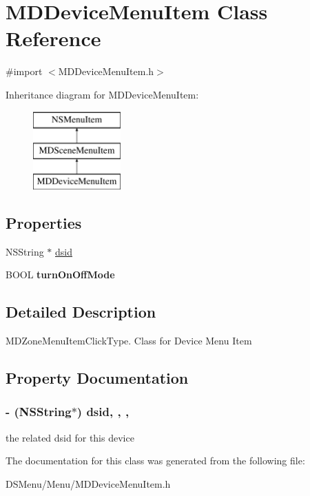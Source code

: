 \hypertarget{interface_m_d_device_menu_item}{\section{M\-D\-Device\-Menu\-Item Class Reference}
\label{interface_m_d_device_menu_item}
}


{\ttfamily \#import $<$M\-D\-Device\-Menu\-Item.\-h$>$}

Inheritance diagram for M\-D\-Device\-Menu\-Item\-:\begin{figure}[H]
\begin{center}
\leavevmode
\includegraphics[height=3.000000cm]{interface_m_d_device_menu_item}
\end{center}
\end{figure}
\subsection*{Properties}
\begin{DoxyCompactItemize}
\item 
N\-S\-String $\ast$ \hyperlink{interface_m_d_device_menu_item_aba1a1c831e4cace1935fef25e04a4b27}{dsid}
\item 
\hypertarget{interface_m_d_device_menu_item_a6c6cf5c639107bdcf7abf5d31fe4d553}{B\-O\-O\-L {\bfseries turn\-On\-Off\-Mode}}\label{interface_m_d_device_menu_item_a6c6cf5c639107bdcf7abf5d31fe4d553}

\end{DoxyCompactItemize}


\subsection{Detailed Description}
M\-D\-Zone\-Menu\-Item\-Click\-Type. Class for Device Menu Item 

\subsection{Property Documentation}
\hypertarget{interface_m_d_device_menu_item_aba1a1c831e4cace1935fef25e04a4b27}{
\subsubsection[{dsid}]{\setlength{\rightskip}{0pt plus 5cm}-\/ (N\-S\-String$\ast$) dsid\hspace{0.3cm}{\ttfamily [read]}, {\ttfamily [write]}, {\ttfamily [atomic]}, {\ttfamily [strong]}}}\label{interface_m_d_device_menu_item_aba1a1c831e4cace1935fef25e04a4b27}
the related dsid for this device 

The documentation for this class was generated from the following file\-:\begin{DoxyCompactItemize}
\item 
D\-S\-Menu/\-Menu/M\-D\-Device\-Menu\-Item.\-h\end{DoxyCompactItemize}
